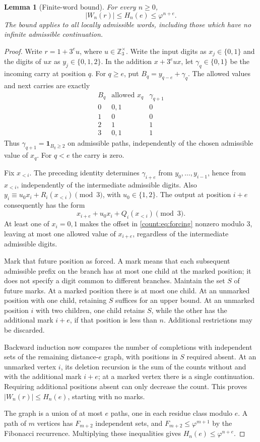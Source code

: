 \documentclass[11pt]{article}
\newtheorem{lemma}[theorem]{Lemma}
\theoremstyle{remark}
\newcommand{\Z}{\mathbb Z}
\begin{document}
\begin{lemma}[Finite-word bound]\label{count:lem:golden}
For every $n\ge0$,
\[
 |W_n(r)|\le H_n(e)\le\varphi^{n+e}.
\]
The bound applies to all locally admissible words, including those
which have no infinite admissible continuation.
\end{lemma}
\begin{proof}
Write $r=1+3^eu$, where $u\in\Z_3^\times$. Write the input digits as
$x_j\in\{0,1\}$ and the digits of $ux$ as $y_j\in\{0,1,2\}$.
In the addition $x+3^eux$, let $\gamma_q\in\{0,1\}$ be the incoming
carry at position $q$. For $q\ge e$, put $B_q=y_{q-e}+\gamma_q$.
The allowed values and next carries are exactly
\[
\begin{array}{c|c|c}
 B_q&\text{allowed }x_q&\gamma_{q+1}\\\hline
 0&0,1&0\\1&0&0\\2&1&1\\3&0,1&1
\end{array}
\]
Thus $\gamma_{q+1}=\mathbf1_{B_q\ge2}$ on admissible paths,
independently of the chosen admissible value of $x_q$. For $q<e$ the
carry is zero.

Fix $x_{<i}$. The preceding identity determines $\gamma_{i+e}$ from
$y_0,\ldots,y_{i-1}$, hence from $x_{<i}$, independently of the
intermediate admissible digits. Also
$y_i\equiv u_0x_i+R_i(x_{<i})\pmod3$, with $u_0\in\{1,2\}$.
The output at position $i+e$ consequently has the form
\begin{equation}\label{count:eq:forcing}
 x_{i+e}+u_0x_i+Q_i(x_{<i})\pmod3.
\end{equation}
At least one of $x_i=0,1$ makes the offset in \eqref{count:eq:forcing}
nonzero modulo $3$, leaving at most one allowed value of $x_{i+e}$,
regardless of the intermediate admissible digits.

Mark that future position as forced. A mark means that each subsequent
admissible prefix on the branch has at most one child at the marked
position; it does not specify a digit common to different branches.
Maintain the set $S$ of future marks. At a marked position there is
at most one child. At an unmarked position with one child, retaining
$S$ suffices for an upper bound. At an unmarked position $i$ with two
children, one child retains $S$, while the other has the additional
mark $i+e$, if that position is less than $n$. Additional restrictions
may be discarded.

Backward induction now compares the number of completions with
independent sets of the remaining distance-$e$ graph, with positions
in $S$ required absent. At an unmarked vertex $i$, its deletion
recursion is the sum of the counts without and with the additional
mark $i+e$; at a marked vertex there is a single continuation.
Requiring additional positions absent can only decrease the count.
This proves $|W_n(r)|\le H_n(e)$, starting with no marks.

The graph is a union of at most $e$ paths, one in each residue class
modulo $e$. A path of $m$ vertices has $F_{m+2}$ independent sets,
and $F_{m+2}\le\varphi^{m+1}$ by the Fibonacci recurrence.
Multiplying these inequalities gives $H_n(e)\le\varphi^{n+e}$.
\end{proof}
\end{document}
